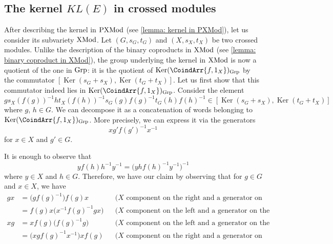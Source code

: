 \documentclass[a4paper, british, reqno]{amsart}
\DeclareMathOperator{\Ker}{Ker} %
\renewcommand*{\and}{,}
\renewcommand*{\and}{,}
\newcommand*{\CatName}[1]{\textnormal{#1}}
\newcommand*{\Grp}{\CatName{Grp}}
\newcommand*{\PXMod}{\CatName{PXMod}}
\newcommand*{\XMod}{\CatName{XMod}}
\theoremstyle{definition}
\theoremstyle{remark}
\begin{document}
\subsection{The kernel \texorpdfstring{\(KL(E)\)}{KL(E)} in crossed modules}\label{subsubsection KLE in XMod}
After describing the kernel in \(\PXMod\) (see \cref{lemma: kernel in PXMod}), let us consider its subvariety \(\XMod\). Let \((G,s_G,t_G)\) and \((X,s_X,t_X)\) be two crossed modules. Unlike the description of the binary coproducts in \(\XMod\) (see \cref{lemma: binary coproduct in XMod}), the group underlying the kernel in \(\XMod\) is now a quotient of the one in \(\Grp\): it is the quotient of \(\Ker(\CoindArr{f\and 1_X})_{\Grp}\) by the commutator \([\Ker(s_G+s_X),\Ker(t_G+t_X)]\). Let us first show that this commutator indeed lies in \(\Ker(\CoindArr{f\and 1_X})_{\Grp}\). Consider the element
\begin{equation}\label{eq - a word in the commutator lies in the kernel}
	gs_X(f(g))^{-1}ht_X(f(h))^{-1}s_G(g)f(g)^{-1}t_G(h)f(h)^{-1}\in [\Ker(s_G+s_X),\Ker(t_G+t_X)]
\end{equation}
where \(g\), \(h\in G\). We can decompose it as a concatenation of words belonging to \(\Ker(\CoindArr{f\and 1_X})_{\Grp}\). More precisely, we can express it via the generators
\[
	xg'f(g')^{-1}x^{-1}
\]
for \(x\in X\) and \(g'\in G\).

It is enough to observe that
\[
	yf(h)h^{-1}y^{-1}=\bigl(yhf(h)^{-1}y^{-1}\bigr)^{-1}
\]
where \(y\in X\) and \(h\in G\). Therefore, we have our claim by observing that for \(g\in G\) and \(x\in X\), we have
\begin{align*}
	gx & =\bigl(gf(g)^{-1}\bigr) f(g)x       &  & \text{(\(X\) component on the right and a generator on the left)}  \\
	   & =f(g)x\bigl(x^{-1}f(g)^{-1}gx\bigr) &  & \text{(\(X\) component on the left and a generator on the right)}  \\
	xg & =xf(g)\bigl(f(g)^{-1}g\bigr)        &  & \text{(\(X\) component on the left and a generator on the right)}  \\
	   & =\bigl(xgf(g)^{-1}x^{-1}\bigr)xf(g) &  & \text{(\(X\) component on the right and a generator on the left).}
\end{align*}
\end{document}
